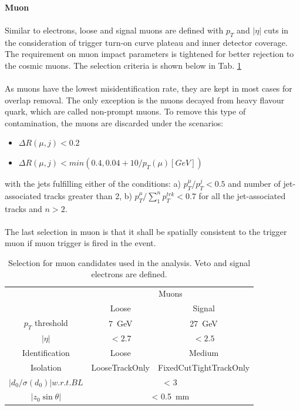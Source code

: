 \noindent
\\{\bf Muon}
\\
\\Similar to electrons, loose and signal muons are defined with $p_{T}$ and $|\eta|$ cuts in the consideration of trigger turn-on curve plateau and inner detector coverage. The requirement on muon impact parameters is tightened for better rejection to the cosmic muons. The selection criteria is shown below in Tab. \ref{Tab:mudefin}
\\
\\As muons have the lowest misidentification rate, they are kept in most cases for overlap removal. The only exception is the muons decayed from heavy flavour quark, which are called non-prompt muons. To remove this type of contamination, the muons are discarded under the scenarios:
\begin{itemize}
	\item $\Delta R(\mu,j)<0.2$
	\item $\Delta R(\mu,j)<min(0.4,0.04+10/p_{T}(\mu)[GeV])$ 
\end{itemize}
\noindent
with the jets fulfilling either of the conditions: a) $p_{T}^{\mu}/p_{T}^j<0.5$ and number of jet-associated tracks greater than 2, b) $p_{T}^{\mu}/\sum^{n}_{1} p_{T}^{trk}<0.7$ for all the jet-associated tracks and $n>2$.
\\
\\The last selection in muon is that it shall be spatially consistent to the trigger muon if muon trigger is fired in the event. 
\begin{table}[htb]
	\caption{Selection for muon candidates used in the analysis. Veto and signal electrons are defined.}\label{Tab:mudefin}
	\centering
	\begin{tabular}{|c||c|c|}
   \hline
& \multicolumn{2}{c|}{Muons}\\
\cline{2-3}
&  Loose & Signal  \\
\hline
$p_T$ threshold &  7~GeV & 27~GeV  \\
\hline
$| \eta |$      &  $< 2.7$ & $< 2.5$   \\
\hline
Identification  &  Loose & Medium  \\
\hline
Isolation       &   LooseTrackOnly & FixedCutTightTrackOnly  \\
\hline
$|d_0/\sigma(d_0)| w.r.t. BL$ &   \multicolumn{2}{|c|}{< 3} \\
\hline
$|z_0\sin\theta| $ &   \multicolumn{2}{|c|}{< 0.5~mm} \\
\hline
	\end{tabular}
\end{table}
